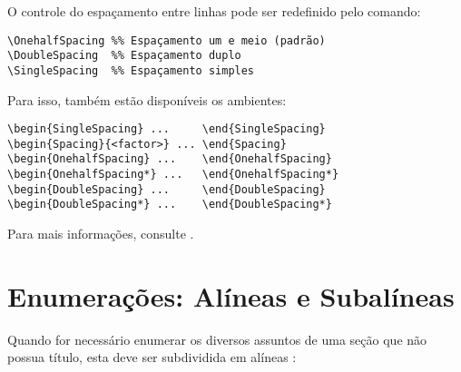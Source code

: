 O controle do espaçamento entre linhas pode ser redefinido pelo comando:

\begin{SingleSpacing}%
\begin{verbatim}
\OnehalfSpacing %% Espaçamento um e meio (padrão)
\DoubleSpacing  %% Espaçamento duplo
\SingleSpacing  %% Espaçamento simples
\end{verbatim}
\end{SingleSpacing}

Para isso, também estão disponíveis os ambientes:

\begin{SingleSpacing}%
\begin{verbatim}
\begin{SingleSpacing} ...     \end{SingleSpacing}
\begin{Spacing}{<factor>} ... \end{Spacing}
\begin{OnehalfSpacing} ...    \end{OnehalfSpacing}
\begin{OnehalfSpacing*} ...   \end{OnehalfSpacing*}
\begin{DoubleSpacing} ...     \end{DoubleSpacing}
\begin{DoubleSpacing*} ...    \end{DoubleSpacing*}
\end{verbatim}
\end{SingleSpacing}

Para mais informações, consulte .

\section{Enumerações: Alíneas e Subalíneas}\label{sec:enumeracoes}

Quando for necessário enumerar os diversos assuntos de uma seção que não possua título, esta deve ser subdividida em alíneas \cite[subseção~4.2]{NBR6024:2012}:

